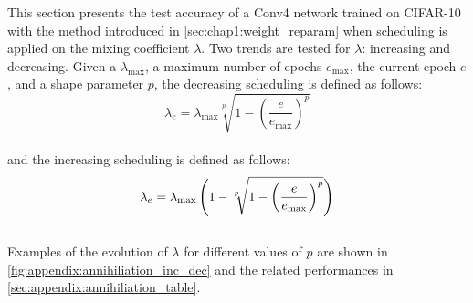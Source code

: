 This section presents the test accuracy of a Conv4 network trained on CIFAR-10
with the method introduced in \cref{sec:chap1:weight_reparam} when scheduling is
applied on the mixing coefficient $\lambda$. Two trends are tested for
$\lambda$: increasing and decreasing. Given a $\lambda_\text{max}$, a maximum
number of epochs $e_\text{max}$, the current epoch $e$, and a shape parameter
$p$, the decreasing scheduling is defined as follows:\\
$$
    \lambda_e = \lambda_\text{max}  \sqrt[p~]{1 - \displaystyle\left(\frac{e}{e_\text{max}}\right)^p}
$$\\
and the increasing scheduling is defined as follows:\\
$$\\
    \lambda_e = \lambda_\text{max} \left( 1- \sqrt[p~]{ 1 - \left(\frac{e}{e_\text{max}}\right)^p} \right)
$$\\
Examples of the evolution of $\lambda$ for different values of $p$ are shown in
\cref{fig:appendix:annihiliation_inc_dec} and the related performances in
\cref{sec:appendix:annihiliation_table}.\\


